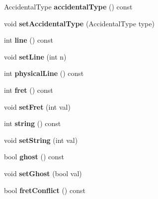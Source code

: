 \begin{DoxyCompactItemize}
Accidental\+Type {\bfseries accidental\+Type} () const
\item 
\mbox{\label{class_ms_1_1_note_aca3299f0339ff9ffdfea8045569fc16b}} 
void {\bfseries set\+Accidental\+Type} (Accidental\+Type type)
\item 
\mbox{\label{class_ms_1_1_note_ac65a5e366eda7035626fb167e4a22ff7}} 
int {\bfseries line} () const
\item 
\mbox{\label{class_ms_1_1_note_a6912d3da9c05f0b7b356f9fbff5008df}} 
void {\bfseries set\+Line} (int n)
\item 
\mbox{\label{class_ms_1_1_note_a4fc3ac51c0e748364e264b60c422ded3}} 
int {\bfseries physical\+Line} () const
\item 
\mbox{\label{class_ms_1_1_note_ab039a328a1e0be6fce9d9ae2d87a1663}} 
int {\bfseries fret} () const
\item 
\mbox{\label{class_ms_1_1_note_a274b9ec8b9be38c1aad55d8f506ab35b}} 
void {\bfseries set\+Fret} (int val)
\item 
\mbox{\label{class_ms_1_1_note_aa5068302dd057f7cd18cdf561b75d18f}} 
int {\bfseries string} () const
\item 
\mbox{\label{class_ms_1_1_note_aeaddfd87a09000f6eb25dc1133ba8472}} 
void {\bfseries set\+String} (int val)
\item 
\mbox{\label{class_ms_1_1_note_a5fef47281b49dd98305c30134df717e2}} 
bool {\bfseries ghost} () const
\item 
\mbox{\label{class_ms_1_1_note_ab203ac79f25f02449fd99d0a995f7e93}} 
void {\bfseries set\+Ghost} (bool val)
\item 
\mbox{\label{class_ms_1_1_note_a22a34a31db73a7057530e42cfe9da0d6}} 
bool {\bfseries fret\+Conflict} () const
\item 
\mbox{\label{class_ms_1_1_note_a85f7480cd12c34659da2e462bef52ec5}} 

\end{DoxyCompactItemize}
